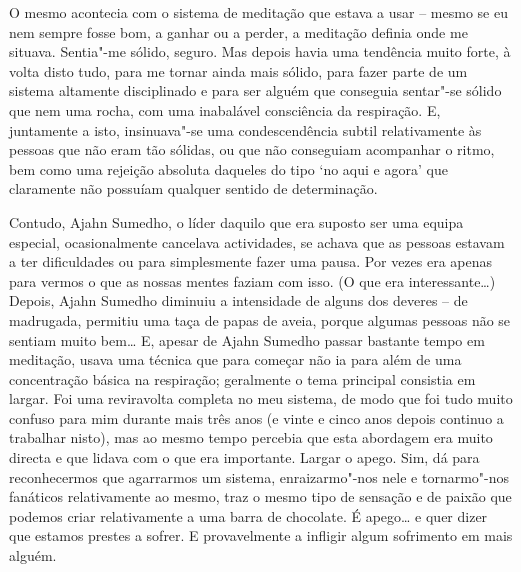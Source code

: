 O mesmo acontecia com o sistema de meditação que estava a usar -- mesmo se eu nem sempre fosse bom, a ganhar ou a perder, a meditação definia onde me situava. Sentia"-me sólido, seguro. Mas depois havia uma tendência muito forte, à volta disto tudo, para me tornar ainda mais sólido, para fazer parte de um sistema altamente disciplinado e para ser alguém que conseguia sentar"-se sólido que nem uma rocha, com uma inabalável consciência da respiração. E, juntamente a isto, insinuava"-se uma condescendência subtil relativamente às pessoas que não eram tão sólidas, ou que não conseguiam acompanhar o ritmo, bem como uma rejeição absoluta daqueles do tipo `no aqui e agora' que claramente não possuíam qualquer sentido de determinação.

Contudo, Ajahn Sumedho, o líder daquilo que era suposto ser uma equipa especial, ocasionalmente cancelava actividades, se achava que as pessoas estavam a ter dificuldades ou para simplesmente fazer uma pausa. Por vezes era apenas para vermos o que as nossas mentes faziam com isso. (O que era interessante\ldots{}) Depois, Ajahn Sumedho diminuiu a intensidade de alguns dos deveres -- de madrugada, permitiu uma taça de papas de aveia, porque algumas pessoas não se sentiam muito bem\ldots{} E, apesar de Ajahn Sumedho passar bastante tempo em meditação, usava uma técnica que para começar não ia para além de uma concentração básica na respiração; geralmente o tema principal consistia em largar. Foi uma reviravolta completa no meu sistema, de modo que foi tudo muito confuso para mim durante mais três anos (e vinte e cinco anos depois continuo a trabalhar nisto), mas ao mesmo tempo percebia que esta abordagem era muito directa e que lidava com o que era importante. Largar o apego. Sim, dá para reconhecermos que agarrarmos um sistema, enraizarmo"-nos nele e tornarmo"-nos fanáticos relativamente ao mesmo, traz o mesmo tipo de sensação e de paixão que podemos criar relativamente a uma barra de chocolate. É apego\ldots{} e quer dizer que estamos prestes a sofrer. E provavelmente a infligir algum sofrimento em mais alguém.

